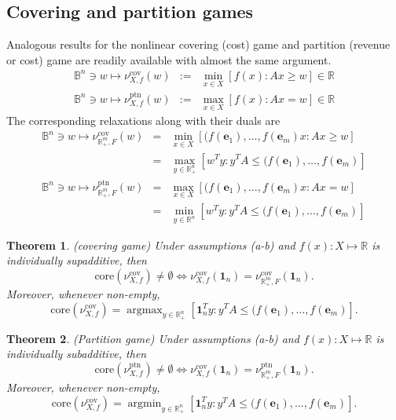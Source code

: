 \documentclass[11pt]{article}\usepackage[]{graphicx}\usepackage[]{xcolor}
\newtheorem{thm}{Theorem}
\DeclareMathOperator*{\argmin}{argmin}
\DeclareMathOperator*{\argmax}{argmax}
\begin{document}
\subsection{Covering and partition games}\label{sub:cover-partition-games}
Analogous results for the nonlinear covering (cost) game and partition (revenue or cost) game are readily available with almost the same argument.
\begin{eqnarray*}
\mathbb{B}^n\ni w\mapsto \nu_{X, f}^{\text{cov}}(w)&:=&\min_{x\in X}  \left[f(x): Ax\ge w\right]\in  \mathbb{R}\\
\mathbb{B}^n\ni w\mapsto \nu_{X, f}^{\text{ptn}}(w)&:=&\max_{x\in X}  \left[f(x): Ax= w\right]\in  \mathbb{R}
\end{eqnarray*}
The corresponding relaxations along with their duals are
\begin{eqnarray*}
\mathbb{B}^n\ni w\mapsto \nu_{\mathbb{R}^m_{+}, F}^{\text{cov}}(w)
&=&\min_{x\in X} \left[(f(\mathbf{e}_1),\dots, f(\mathbf{e}_m)x: Ax\ge w\right]\\
&=&\max_{y\in \mathbb{R}^n_{+}} \left[w^Ty: y^TA\le (f(\mathbf{e}_1),\dots, f(\mathbf{e}_m)\right]\\ 
\mathbb{B}^n\ni w\mapsto  \nu_{\mathbb{R}^m_{+}, F}^{\text{ptn}}(w)&=&\max_{x\in X} \left[(f(\mathbf{e}_1),\dots, f(\mathbf{e}_m)x: Ax= w\right]\\
&=&\min_{y\in \mathbb{R}^n} \left[w^Ty: y^TA\le (f(\mathbf{e}_1),\dots, f(\mathbf{e}_m)\right] 
\end{eqnarray*}

\begin{thm}\label{thm:nonlinear-covering-game} (covering game)
Under assumptions (a-b) and $f(x): X\mapsto \mathbb{R}$ is individually supadditive, then 
\[
\text{core}\left(\nu_{X, f}^{\text{cov}}\right)\ne\emptyset \iff \nu_{X, f}^{\text{cov}}\left(\mathbf{1}_n\right)=\nu_{\mathbb{R}^m_{+}, F}^{\text{cov}}\left(\mathbf{1}_n\right).
\]
Moreover, whenever non-empty, 
\[
\text{core}\left(\nu_{X, f}^{\text{cov}}\right)= \argmax_{y\in \mathbb{R}^n_{+}} \left[\mathbf{1}_n^Ty: y^TA\le (f(\mathbf{e}_1),\dots, f(\mathbf{e}_m)\right].
\]
\end{thm}

\begin{thm}\label{thm:nonlinear-partition-game} (Partition game)
Under assumptions (a-b) and $f(x): X\mapsto \mathbb{R}$ is individually subadditive, then 
\[
\text{core}\left(\nu_{X, f}^{\text{ptn}}\right)\ne\emptyset \iff \nu_{X, f}^{\text{cov}}\left(\mathbf{1}_n\right)=\nu_{\mathbb{R}^m_{+}, F}^{\text{ptn}}\left(\mathbf{1}_n\right).
\]
Moreover, whenever non-empty, 
\[
\text{core}\left(\nu_{X, f}^{\text{cov}}\right)= \argmin_{y\in \mathbb{R}^n_{+}} \left[\mathbf{1}_n^Ty: y^TA\le (f(\mathbf{e}_1),\dots, f(\mathbf{e}_m)\right].
\]
\end{thm}
\end{document}
